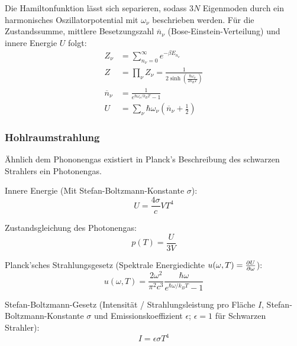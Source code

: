 \documentclass[11pt]{article}
\numberwithin{equation}{section}
\begin{document}
        Die Hamiltonfunktion lässt sich separieren, sodass $3N$ Eigenmoden durch ein harmonisches Oszillatorpotential mit $\omega_\nu$ beschrieben werden. Für die Zustandssumme, mittlere Besetzungszahl $\overline{n}_\nu$ (Bose-Einstein-Verteilung) und innere Energie $U$ folgt:
        \begin{equation}
          \begin{aligned}
            Z_\nu &= \sum_{n_\nu=0}^\infty e^{-\beta E_{n_\nu}} \\
            Z &= \prod_\nu Z_\nu = \frac{1}{2\sinh{\left( \frac{\hbar\omega_\nu}{2 k_B T} \right)}} \\
            \overline{n}_\nu &= \frac{1}{e^{\hbar\omega_\nu/k_B T} - 1} \\
            U &= \sum_\nu \hbar\omega_\nu \left(\overline{n}_\nu + \frac{1}{2}\right)
          \end{aligned}
        \end{equation}

      \subsubsection{Hohlraumstrahlung}
        Ähnlich dem Phononengas existiert in Planck's Beschreibung des schwarzen Strahlers ein Photonengas. \vsp

        Innere Energie (Mit Stefan-Boltzmann-Konstante $\sigma$):
        \begin{equation}
          U = \frac{4\sigma}{c} V T^4
        \end{equation}

        Zustandsgleichung des Photonengas:
        \begin{equation}
          p(T) = \frac{U}{3V}
        \end{equation}

        Planck'sches Strahlungsgesetz (Spektrale Energiedichte $u(\omega,T) = \frac{\partial U}{\partial \omega}$):
        \begin{equation}
          u(\omega,T) = \frac{2 \omega^2}{\pi^2 c^3} \frac{\hbar \omega}{e^{\hbar \omega / k_B T} - 1}
        \end{equation}

        Stefan-Boltzmann-Gesetz (Intensität / Strahlungsleistung pro Fläche $I$, Stefan-Boltzmann-Konstante $\sigma$ und Emissionskoeffizient $\epsilon$; $\epsilon=1$ für Schwarzen Strahler):
        \begin{equation}
          I = \epsilon\sigma T^4
        \end{equation}
\end{document}
